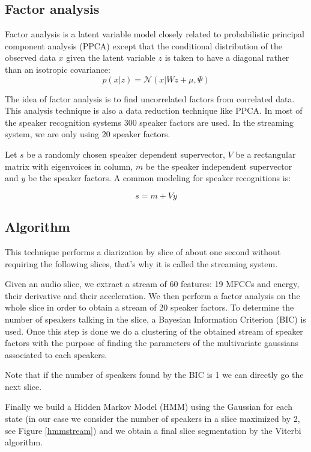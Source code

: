 \documentclass{techrep} %
\begin{document}
\subsection{Factor analysis}

Factor analysis is a latent variable model closely related to
probabilistic principal component analysis (PPCA) except that the
conditional distribution of the observed data $x$ given the latent
variable $z$ is taken to have a diagonal rather than an isotropic
covariance:
$$p(x|z) = \mathcal{N}(x|Wz + \mu, \Psi)$$

The idea of factor analysis is to find uncorrelated factors from
correlated data. This analysis technique is also a data reduction
technique like PPCA.  In most of the speaker recognition systems 300
speaker factors are used. In the streaming system, we are only using
20 speaker factors.

Let $s$ be a randomly chosen speaker dependent supervector, $V$ be a
rectangular matrix with eigenvoices in column, $m$ be the speaker
independent supervector and $y$ be the speaker factors. A common
modeling for speaker recognitions is:

$$ s = m + Vy $$

\subsection{Algorithm}

This technique performs a diarization by slice of about one second
without requiring the following slices, that's why it is called the
streaming system.

Given an audio slice, we extract a stream of 60 features: 19 MFCCs and
energy, their derivative and their acceleration. We then perform a
factor analysis on the whole slice in order to obtain a stream of 20
speaker factors.  To determine the number of speakers talking in the
slice, a Bayesian Information Criterion (BIC) is used.  Once this step
is done we do a clustering of the obtained stream of speaker factors
with the purpose of finding the parameters of the multivariate
gaussians associated to each speakers.

Note that if the number of speakers found by the BIC is 1 we can
directly go the next slice.

Finally we build a Hidden Markov Model (HMM) using the Gaussian for
each state (in our case we consider the number of speakers in a slice
maximized by 2, see Figure \ref{hmmstream}) and we obtain a final
slice segmentation by the Viterbi algorithm.
\end{document}
